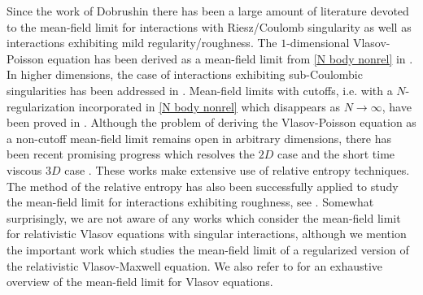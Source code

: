 \documentclass[11pt,reqno]{amsart}
\numberwithin{equation}{section}
\begin{document}
Since the work of Dobrushin there has been a large amount of literature devoted to the mean-field limit for interactions with Riesz/Coulomb singularity as well as interactions exhibiting mild regularity/roughness. The $1$-dimensional Vlasov-Poisson equation has been derived as a mean-field limit from \eqref{N body nonrel} in \cite{hauray2012mean}. In higher dimensions, the case of interactions exhibiting sub-Coulombic singularities has been addressed in \cite{hauray2007n,hauray2015particle}. Mean-field limits with cutoffs, i.e. with a $N$-regularization incorporated in \eqref{N body nonrel} which disappears as $N\rightarrow \infty$, have been proved in \cite{lazarovici2016vlasov,lazarovici2017mean,FeistlHeldPickl2025}.  Although the problem of deriving the Vlasov-Poisson equation as a non-cutoff mean-field limit remains open in arbitrary dimensions, there has been recent promising progress which resolves the $2D$ case \cite{bresch2025new,duerinckx2026derivation} and the short time viscous $3D$ case \cite{FengWang2026}. These works make extensive use of relative entropy techniques. The method of the relative entropy has also been successfully applied to study the mean-field limit for interactions exhibiting roughness, see \cite{JabinWang2018, jabin2016mean}. Somewhat surprisingly, we are not aware of any works which consider the mean-field limit for relativistic Vlasov equations with singular interactions, although we mention the important work \cite{golse2012mean} which studies the mean-field limit of a regularized version of the relativistic Vlasov-Maxwell equation. We also refer to \cite{jabin2014review} for an exhaustive overview of the mean-field limit for Vlasov equations. 

\vspace{0.4 cm}
\end{document}
